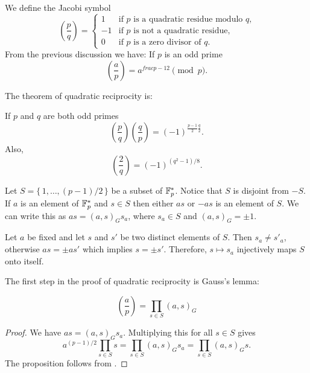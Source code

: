 We define the Jacobi symbol 
\[
\left(\frac{p}{q}\right) = 
  \begin{cases}
    1 & \text{if $p$ is a quadratic residue modulo $q$,} \\
    -1 & \text{if $p$ is not a quadratic residue,} \\
    0 & \text{if $p$ is a zero divisor of $q$.}
  \end{cases}
\]
From the previous discussion we have:
If $p$ is an odd prime
\begin{equation}\label{Jacobi:Sym:Eq}
\left(\frac{a}{p}\right) = a^{frac{p -1}{2}} \pmod{p}.
\end{equation}

The theorem of quadratic reciprocity is:

\begin{proposition}[Gauss]
\label{QuadraticReciproc:Prop}
If $p$ and $q$ are both odd primes
\[
\left(\frac{p}{q}\right)  \left(\frac{q}{p}\right) =
(-1)^{\frac{p -1}{2} \frac{q}{2}}.
\]
Also,
\[
\left(\frac{2}{q}\right) = (-1)^{(q^2-1)/8}.
\]
\end{proposition}

Let $S = \{\,1, \ldots, (p-1)/2\,\}$ be a subset of $\mathbb{F}_p^{\ast}$.
Notice that $S$ is disjoint from $-S$.  If $a$ is an element of
$\mathbb{F}_p^{\ast}$ and $s \in S$ then either $as$ or $-as$ is an element of
$S$.  We can write this as $as = (a, s)_G s_a$, where $s_a \in S$ and
$(a, s)_G = \pm 1$.

Let $a$ be fixed and let $s$ and $s'$ be two distinct elements of $S$.
Then $s_a \not= s'_a$, otherwise $as  = \pm as'$ which implies $s =
\pm s'$.  Therefore, $s \mapsto s_a$ injectively maps $S$ onto itself.

The first step in the proof of quadratic reciprocity is Gauss's lemma:

\begin{proposition}
\[
\left(\frac{a}{p}\right) = \prod_{s \in S} (a, s)_G
\]
\end{proposition}

\begin{proof}
We have $as = (a,s)_G s_a$.  Multiplying this for all $s \in S$ gives
\[
a^{(p-1)/2} \prod_{s\in S} s = \prod_{s\in S} (a, s)_G s_a
 = \prod_{s\in S} (a, s)_G s.
\]
The proposition follows from .
\end{proof}


